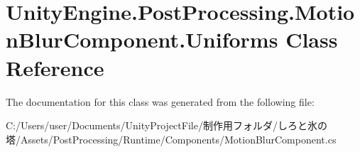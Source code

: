 \hypertarget{class_unity_engine_1_1_post_processing_1_1_motion_blur_component_1_1_uniforms}{}\section{Unity\+Engine.\+Post\+Processing.\+Motion\+Blur\+Component.\+Uniforms Class Reference}
\label{class_unity_engine_1_1_post_processing_1_1_motion_blur_component_1_1_uniforms}


The documentation for this class was generated from the following file\+:\begin{DoxyCompactItemize}
\item 
C\+:/\+Users/user/\+Documents/\+Unity\+Project\+File/制作用フォルダ/しろと氷の塔/\+Assets/\+Post\+Processing/\+Runtime/\+Components/Motion\+Blur\+Component.\+cs\end{DoxyCompactItemize}
